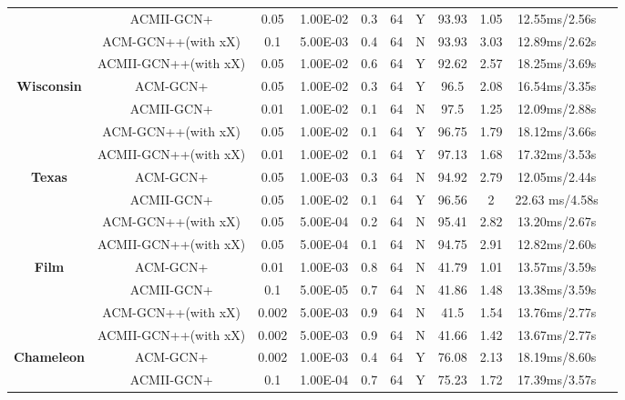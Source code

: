 \documentclass{article}
\newcommand{\0}{{\boldsymbol{0}}}
\newcommand{\6}{{\partial}}
\newcommand{\8}{{\infty}}
\newcommand{\4}{{\nabla}}
\begin{document}
\begin{table}[htbp]
{\begin{tabular}{c|c|ccccccccc}
          & ACMII-GCN+ & 0.05  & 1.00E-02 & 0.3   & 64    & Y     & 93.93 & 1.05  & 12.55ms/2.56s \\
          & ACM-GCN++(with xX) & 0.1   & 5.00E-03 & 0.4   & 64    & N     & 93.93 & 3.03  & 12.89ms/2.62s \\
          & ACMII-GCN++(with xX) & 0.05  & 1.00E-02 & 0.6   & 64    & Y     & 92.62 & 2.57  & 18.25ms/3.69s \\
    \midrule
    \multirow{4}[1]{*}{\textbf{Wisconsin}} & ACM-GCN+ & 0.05  & 1.00E-02 & 0.3   & 64    & Y     & 96.5  & 2.08  & 16.54ms/3.35s \\
          & ACMII-GCN+ & 0.01  & 1.00E-02 & 0.1   & 64    & N     & 97.5  & 1.25  & 12.09ms/2.88s \\
          & ACM-GCN++(with xX) & 0.05  & 1.00E-02 & 0.1   & 64    & Y     & 96.75 & 1.79  & 18.12ms/3.66s \\
          & ACMII-GCN++(with xX) & 0.01  & 1.00E-02 & 0.1   & 64    & Y     & 97.13 & 1.68  & 17.32ms/3.53s \\
    \midrule
    \multirow{4}[1]{*}{\textbf{Texas}} & ACM-GCN+ & 0.05  & 1.00E-03 & 0.3   & 64    & N     & 94.92 & 2.79  & 12.05ms/2.44s \\
          & ACMII-GCN+ & 0.05  & 1.00E-02 & 0.1   & 64    & Y     & 96.56 & 2     &  22.63 ms/4.58s \\
          & ACM-GCN++(with xX) & 0.05  & 5.00E-04 & 0.2   & 64    & N     & 95.41 & 2.82  & 13.20ms/2.67s \\
          & ACMII-GCN++(with xX) & 0.05  & 5.00E-04 & 0.1   & 64    & N     & 94.75 & 2.91  & 12.82ms/2.60s \\
    \midrule
    \multirow{4}[1]{*}{\textbf{Film}} & ACM-GCN+ & 0.01  & 1.00E-03 & 0.8   & 64    & N     & 41.79 & 1.01  & 13.57ms/3.59s \\
          & ACMII-GCN+ & 0.1   & 5.00E-05 & 0.7   & 64    & N     & 41.86 & 1.48  & 13.38ms/3.59s \\
          & ACM-GCN++(with xX) & 0.002 & 5.00E-03 & 0.9   & 64    & N     & 41.5  & 1.54  & 13.76ms/2.77s \\
          & ACMII-GCN++(with xX) & 0.002 & 5.00E-03 & 0.9   & 64    & N     & 41.66 & 1.42  & 13.67ms/2.77s \\
    \midrule
    \multirow{4}[1]{*}{\textbf{Chameleon}} & ACM-GCN+ & 0.002 & 1.00E-03 & 0.4   & 64    & Y     & 76.08 & 2.13  & 18.19ms/8.60s \\
          & ACMII-GCN+ & 0.1   & 1.00E-04 & 0.7   & 64    & Y     & 75.23 & 1.72  & 17.39ms/3.57s \\

\end{tabular}}
\end{table}
\end{document}
